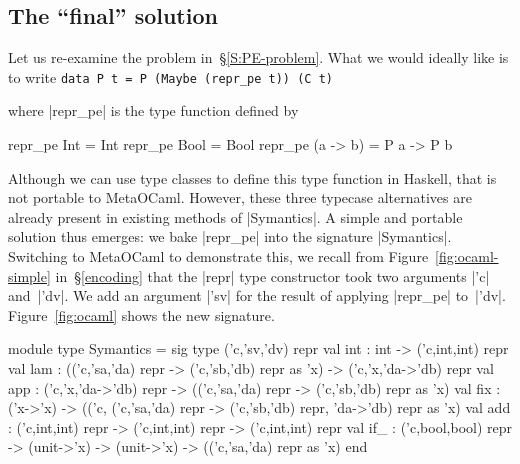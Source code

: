 \subsection{The ``final'' solution}
\label{S:PE-solution}
Let us re-examine the problem in~\S\ref{S:PE-problem}. What we
would ideally like is to write
\texttt{data P t = P (Maybe (repr\_pe t)) (C t)}
\begin{comment}
\begin{code}
data P t = P (Maybe (repr_pe t)) (C t)
\end{code}
\end{comment}
where |repr_pe| is the type function defined
by\vspace*{-0.8em}
\begin{code3}
repr_pe Int      = Int          repr_pe Bool     = Bool
repr_pe (a -> b) = P a -> P b
\end{code3}
\vspace*{-0.8em}
Although we can use type classes to define this type function
in Haskell, that is not portable to MetaOCaml. However,
these three typecase alternatives are already present in existing
methods of |Symantics|.
A simple and portable solution thus emerges: we bake |repr_pe| 
into the signature |Symantics|. Switching to MetaOCaml to demonstrate this,
we recall from Figure~\ref{fig:ocaml-simple} in~\S\ref{encoding} that the |repr| type
constructor took two arguments |'c| and~|'dv|. We add an argument
|'sv| for the result of applying |repr_pe| to~|'dv|.
Figure~\ref{fig:ocaml} shows the new signature.
\begin{figure*}
\begin{floatrule}
\begin{code}
module type Symantics = sig type ('c,'sv,'dv) repr
  val int : int  -> ('c,int,int) repr
  val lam : (('c,'sa,'da) repr -> ('c,'sb,'db) repr as 'x) -> ('c,'x,'da->'db) repr
  val app : ('c,'x,'da->'db) repr -> (('c,'sa,'da) repr -> ('c,'sb,'db) repr as 'x)
  val fix : ('x->'x) -> (('c, ('c,'sa,'da) repr -> ('c,'sb,'db) repr, 'da->'db) repr as 'x)
  val add : ('c,int,int) repr -> ('c,int,int) repr -> ('c,int,int) repr
  val if_ : ('c,bool,bool) repr -> (unit->'x) -> (unit->'x) -> (('c,'sa,'da) repr as 'x)
end
\end{code}
\end{floatrule}
\caption{A (Meta)OCaml embedding of our object language that supports
  partial evaluation (\texttt{bool}, \texttt{mul},
\texttt{leq} are elided)}
\label{fig:ocaml}
\end{figure*}


